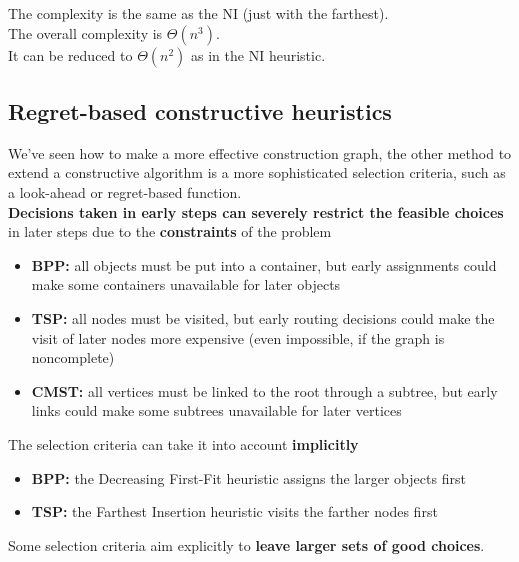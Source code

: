 The complexity is the same as the NI (just with the farthest).\\

The overall complexity is $\Theta (n^3)$.\\

It can be reduced to $\Theta (n^2)$ as in the NI heuristic.\\

\newpage

\subsection{Regret-based constructive heuristics}
We've seen how to make a more effective construction graph, the other method to extend a constructive algorithm is a more sophisticated selection criteria, such as a look-ahead or regret-based function.\\

\textbf{Decisions taken in early steps can severely restrict the feasible choices} in later steps due to the \textbf{constraints} of the problem
\begin{itemize}
	\item \textbf{BPP:} all objects must be put into a container, but early assignments could make some containers unavailable for later objects
	
	\item \textbf{TSP:} all nodes must be visited, but early routing decisions could make the visit of later nodes more expensive (even impossible, if the graph is noncomplete)
	
	\item \textbf{CMST:} all vertices must be linked to the root through a subtree, but early links could make some subtrees unavailable for later vertices
\end{itemize}

The selection criteria can take it into account \textbf{implicitly}
\begin{itemize}
	\item \textbf{BPP:} the Decreasing First-Fit heuristic assigns the larger objects first
	\item \textbf{TSP:} the Farthest Insertion heuristic visits the farther nodes first
\end{itemize}

Some selection criteria aim explicitly to \textbf{leave larger sets of good choices}.\\

